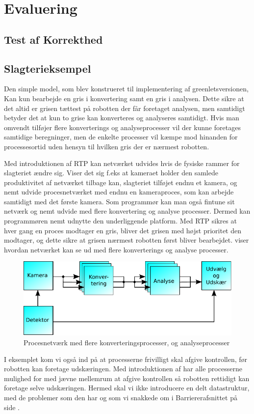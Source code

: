\section{Evaluering}
\subsection{Test af Korrekthed}
\subsection{Slagterieksempel}
Den simple model, som blev konstrueret til implementering af greenletsversionen, Kan kun bearbejde en gris i konvertering samt en gris i analysen. Dette sikre at det altid er grisen tættest på robotten der får foretaget analysen, men samtidigt betyder det at kun to grise kan konverteres og analyseres samtidigt. Hvis man omvendt tilføjer flere konverterings og analyseprocesser vil der kunne foretages samtidige beregninger, men de enkelte processer vil kæmpe mod hinanden for processesortid uden hensyn til hvilken gris der er nærmest robotten.

Med introduktionen af RTP kan netværket udvides hvis de fysiske rammer for slagteriet ændre sig. Viser det sig f.eks at kameraet holder den samlede produktivitet af netværket tilbage kan, slagteriet tilføjet endnu et kamera, og nemt udvide procesnetværket med endnu en kameraproces, som kan arbejde samtidigt med det første kamera. 
Som programmør kan man også fintune sit netværk og nemt udvide med flere konvertering og analyse processer. Dermed kan programmøren nemt udnytte den underliggende platform. Med RTP sikres at hver gang en proces modtager en gris, bliver det grisen med højst prioritet den modtager, og dette sikre at grisen nærmest robotten først bliver bearbejdet. 
 viser hvordan netværket kan se ud med flere konverterings og analyse processer. 

\begin{figure}
 \begin{center}
  \includegraphics[scale=1]{images/pig-network3}
	\caption{Procesnetværk med flere konverteringsprocesser, og analyseprocesser}
	\label{fig:pig-network3}
\end{center}
\end{figure}


I eksemplet kom vi også ind på at processerne frivilligt skal afgive kontrollen, før robotten kan foretage udskæringen. Med introduktionen af  har alle processerne  mulighed for med jævne mellemrum at afgive kontrollen så robotten rettidigt kan foretage selve udskæringen. Hermed skal vi ikke  introducere en delt datastruktur, med de problemer som den har og som vi snakkede om i Barriererafsnittet på side \pageref{sec:barrierer}.
 
